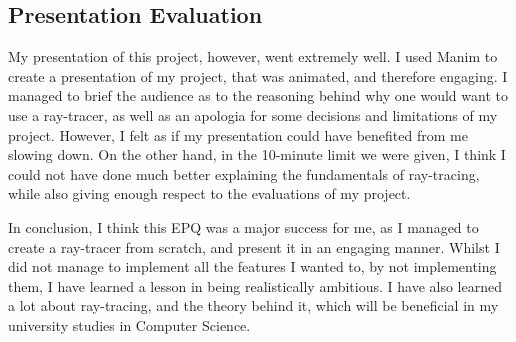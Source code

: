 \documentclass[../main.tex]{subfiles}
\begin{document}
\subsection{Presentation Evaluation}
My presentation of this project, however, went extremely well. I used Manim \cite{noauthor_manim_nodate} to create a presentation of my project, that was 
animated, and therefore engaging. I managed to brief the audience as to the reasoning behind why one would want to use a ray-tracer,
as well as an apologia for some decisions and limitations of my project. However, I felt as if my presentation could have benefited 
from me slowing down. On the other hand, in the 10-minute limit we were given, I think I could not have done much better explaining 
the fundamentals of ray-tracing, while also giving enough respect to the evaluations of my project.

In conclusion, I think this EPQ was a major success for me, as I managed to create a ray-tracer from scratch, and present it in an
engaging manner. Whilst I did not manage to implement all the features I wanted to, by not implementing them, I have
learned a lesson in being realistically ambitious. I have also learned a lot about ray-tracing, and the theory behind it, which
will be beneficial in my university studies in Computer Science.
\end{document}
